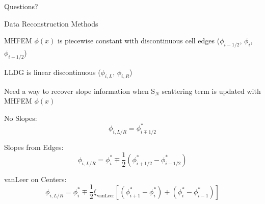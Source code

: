 \documentclass[10pt]{beamer}
\newcommand{\SN}{S$_N$\xspace}
\begin{document}
\begin{frame}[standout]
  Questions?
\end{frame}

\begin{frame}{Data Reconstruction Methods}

	MHFEM $\phi(x)$ is piecewise constant with discontinuous cell edges ($\phi_{i-1/2}$, $\phi_i$, $\phi_{i+1/2}$)

	LLDG is linear discontinuous ($\phi_{i,L}$, $\phi_{i,R}$)

	Need a way to recover slope information when \SN scattering term is updated with MHFEM $\phi(x)$ 

	No Slopes: 
	\begin{equation*}
		\phi_{i,L/R} = \phi_{i\mp1/2}^*
	\end{equation*}

	Slopes from Edges: 
	\begin{equation*}
		\phi_{i,L/R} = \phi_i^* \mp \frac{1}{2} \left(
		\phi_{i+1/2}^* - \phi_{i-1/2}^* \right)
	\end{equation*}

	vanLeer on Centers: 
	\begin{equation*}
		\phi_{i,L/R} = \phi_i^* \mp \frac{1}{2} \xi_\text{vanLeer} \left[ 
			\left(\phi_{i+1}^* - \phi_i^*\right) + \left(\phi_{i}^* - \phi_{i-1}^*\right)
		 \right]
	\end{equation*}

\end{frame}
\end{document}
